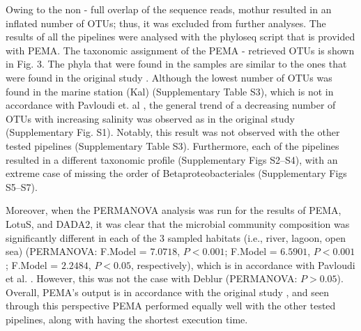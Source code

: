    Owing to the non - full overlap of the sequence reads, mothur resulted in an inflated number of OTUs; 
   thus, it was excluded from further analyses. 
   The results of all the pipelines were analysed with the phyloseq script that is provided with PEMA. 
   The taxonomic assignment of the PEMA - retrieved OTUs is shown in Fig. 3. 
   The phyla that were found in the samples are similar to the ones that were found in the original study \citep{pavloudi2017sediment}. 
   Although the lowest number of OTUs was found in the marine station (Kal) (Supplementary Table S3), which is not in accordance with Pavloudi et. al \citep{pavloudi2017sediment}, the general trend of a decreasing number of OTUs with increasing salinity was observed as in the original study (Supplementary Fig. S1). 
   Notably, this result was not observed with the other tested pipelines (Supplementary Table S3). 
   Furthermore, each of the pipelines resulted in a different taxonomic profile (Supplementary Figs S2–S4), with an extreme case of missing the order of Betaproteobacteriales (Supplementary Figs S5–S7).


   Moreover, when the PERMANOVA analysis was run for the results of PEMA, LotuS, and DADA2, it was clear that the microbial community composition was significantly different in each of the $3$ sampled habitats (i.e., river, lagoon, open sea) (PERMANOVA: F.Model = $7.0718$, $P < 0.001$; F.Model = $6.5901$, $P < 0.001$; F.Model = $2.2484$, $P < 0.05$, respectively), which is in accordance with Pavloudi et al. \citep{pavloudi2017sediment}. 
   However, this was not the case with Deblur (PERMANOVA: $P > 0.05$). 
   Overall, PEMA's output is in accordance with the original study \citep{pavloudi2017sediment}, and seen through this perspective PEMA performed equally well with the other tested pipelines, along with having the shortest execution time.


